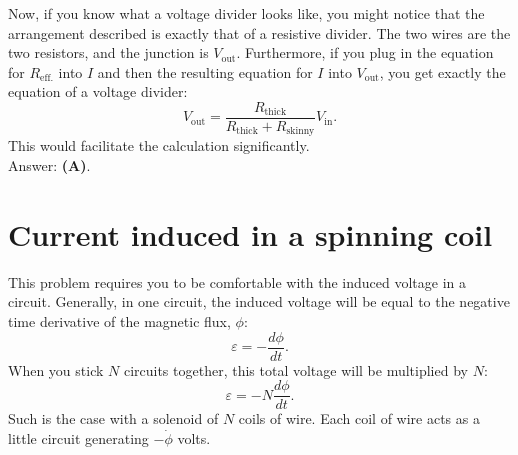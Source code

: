 \documentclass[11pt]{paper}
\newcommand{\answer}[1]{Answer: \textbf{(#1)}.}
\begin{document}
Now, if you know what a voltage divider looks like, you might notice that the arrangement described is exactly that of a resistive divider.  The two wires are the two resistors, and the junction is $V_\text{out}$.  Furthermore, if you plug in the equation for $R_\text{eff.}$ into $I$ and then the resulting equation for $I$ into $V_\text{out}$, you get exactly the equation of a voltage divider:
\begin{equation}
	V_\text{out} = \frac{R_\text{thick}}{R_\text{thick}+R_\text{skinny}}V_\text{in}.
\end{equation}
This would facilitate the calculation significantly.\\

\answer{A}

\section{Current induced in a spinning coil}
This problem requires you to be comfortable with the induced voltage in a circuit.  Generally, in one circuit, the induced voltage will be equal to the negative time derivative of the magnetic flux, $\phi$:
\begin{equation}
	\varepsilon = -\frac{d \phi}{dt}.
\end{equation}
When you stick $N$ circuits together, this total voltage will be multiplied by $N$:
\begin{equation}
	\varepsilon = -N\frac{d \phi}{dt}.
\end{equation}
Such is the case with a solenoid of $N$ coils of wire.  Each coil of wire acts as a little circuit generating $-\dot{\phi}$ volts.
\end{document}
